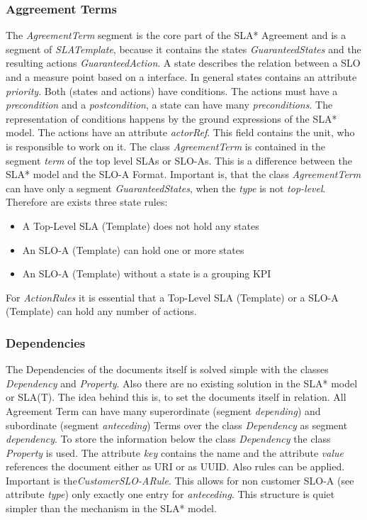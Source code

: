 \subsubsection{Aggreement Terms}
The {\it AgreementTerm} segment is the core part of the SLA* Agreement and is a segment of {\it SLATemplate}, because it contains the states {\it GuaranteedStates} and the resulting actions {\it GuaranteedAction}. A state describes the relation between a SLO and a measure point based on a interface. In general states contains an attribute {\it priority}. Both (states and actions) have conditions. The actions must have a {\it precondition} and a {\it postcondition}, a state can have many {\it preconditions}. The representation of conditions happens by the ground expressions of the SLA* model. The actions have an attribute {\it actorRef}. This field contains the unit, who is responsible to work on it. The class {\it AgreementTerm} is contained in the segment {\it term} of the top level SLAs or SLO-As. This is a difference between the SLA* model and the SLO-A Format. Important is, that the class {\it AgreementTerm} can have only a segment {\it GuaranteedStates}, when the {\it type} is not {\it top-level}. Therefore are exists three state rules:
\begin{itemize}
\item A Top-Level SLA (Template) does not hold any states
\item An SLO-A (Template) can hold one or more states
\item An SLO-A (Template) without a state is a grouping KPI
\end{itemize}
For {\it ActionRules} it is essential that a Top-Level SLA (Template) or a SLO-A (Template) can hold any number of actions.

\subsubsection{Dependencies}
The Dependencies of the documents itself is solved simple with the classes {\it Dependency} and {\it Property}. Also there are no existing solution in the SLA* model or SLA(T). The idea behind this is, to set the documents itself in relation. All Agreement Term can have many superordinate (segment {\it depending})  and subordinate (segment {\it anteceding}) Terms over the class {\it Dependency} as segment {\it dependency}. To store the information below the class {\it Dependency} the class {\it Property} is used. The attribute {\it key} contains the name and the attribute {\it value} references the document either as URI or as UUID.
Also rules can be applied. Important is the{\it CustomerSLO-ARule}. This allows for non customer SLO-A (see attribute {\it type}) only exactly one entry for {\it anteceding}. This structure is quiet simpler than the mechanism in the SLA* model. 

